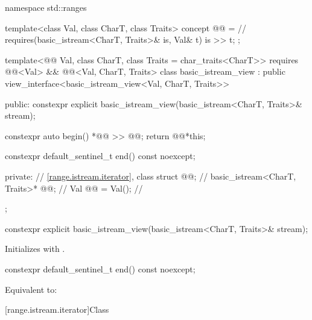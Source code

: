 %
\begin{codeblock}
namespace std::ranges {
  template<class Val, class CharT, class Traits>
    concept @@ =                // \expos
      requires(basic_istream<CharT, Traits>& is, Val& t) {
        is >> t;
      };

  template<@@ Val, class CharT, class Traits = char_traits<CharT>>
    requires @@<Val> &&
             @@<Val, CharT, Traits>
  class basic_istream_view : public view_interface<basic_istream_view<Val, CharT, Traits>> {
  public:
    constexpr explicit basic_istream_view(basic_istream<CharT, Traits>& stream);

    constexpr auto begin() {
      *@@ >> @@;
      return @@{*this};
    }

    constexpr default_sentinel_t end() const noexcept;

  private:
    // \ref{range.istream.iterator}, class 
    struct @@;                            // \expos
    basic_istream<CharT, Traits>* @@;      // \expos
    Val @@ = Val();                         // \expos
  };
}
\end{codeblock}

%
\begin{itemdecl}
constexpr explicit basic_istream_view(basic_istream<CharT, Traits>& stream);
\end{itemdecl}

\begin{itemdescr}
\pnum
\effects
Initializes  with .
\end{itemdescr}

%
\begin{itemdecl}
constexpr default_sentinel_t end() const noexcept;
\end{itemdecl}

\begin{itemdescr}
\pnum
\effects
Equivalent to: 
\end{itemdescr}

[range.istream.iterator]{Class }

